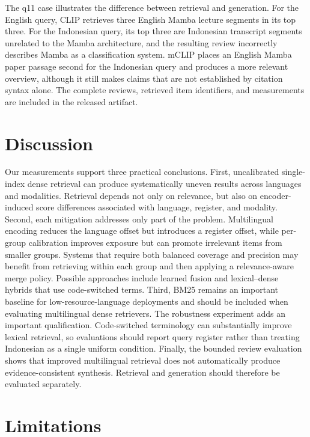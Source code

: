 \documentclass[conference]{IEEEtran}
\begin{document}
The q11 case illustrates the difference between retrieval and generation.
For the English query, CLIP retrieves three English Mamba lecture segments
in its top three. For the Indonesian query, its top three are Indonesian
transcript segments unrelated to the Mamba architecture, and the resulting
review incorrectly describes Mamba as a classification system. mCLIP places
an English Mamba paper passage second for the Indonesian query and produces
a more relevant overview, although it still makes claims that are not
established by citation syntax alone. The complete reviews, retrieved item
identifiers, and measurements are included in the released artifact.

\section{Discussion}

Our measurements support three practical conclusions. First, uncalibrated
single-index dense retrieval can produce systematically uneven results
across languages and modalities. Retrieval depends not only on relevance,
but also on encoder-induced score differences associated with language,
register, and modality. Second, each mitigation addresses only part of the
problem. Multilingual encoding reduces the language offset but introduces a
register offset, while per-group calibration improves exposure but can
promote irrelevant items from smaller groups. Systems that require both
balanced coverage and precision may benefit from retrieving within each
group and then applying a relevance-aware merge policy. Possible approaches
include learned fusion and lexical--dense hybrids that use code-switched
terms. Third, BM25 remains an important baseline for low-resource-language
deployments and should be included when evaluating multilingual dense
retrievers. The robustness experiment adds an important qualification.
Code-switched terminology can substantially improve lexical retrieval, so
evaluations should report query register rather than treating Indonesian as
a single uniform condition. Finally, the bounded review evaluation shows
that improved multilingual retrieval does not automatically produce
evidence-consistent synthesis. Retrieval and generation should therefore be
evaluated separately.

\section{Limitations}
\label{sec:limits}
\end{document}
